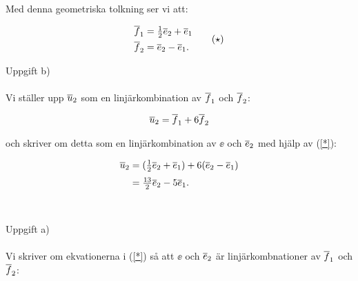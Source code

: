 \documentclass{article}
\begin{document}
\noindent Med denna geometriska tolkning ser vi att:

\begin{equation}
  \begin{aligned}
    \overline{f}_{1} &= \tfrac{1}{2}\overline{e}_{2} + \overline{e}_{1} \\
    \overline{f}_{2} &= \overline{e}_{2} - \overline{e}_{1}\text{.}
  \end{aligned}
  \tag{$\star$}\label{*}
\end{equation}

%
%
%

\newpage

\noindent Uppgift b)
\\
\\
Vi ställer upp $\overline{u}_{2}$ som en linjärkombination av $\overline{f}_{1}$ och $\overline{f}_{2}$:

\begin{gather*}
  \overline{u}_{2} = \overline{f}_{1} + 6\overline{f}_{2}
\end{gather*}

\noindent och skriver om detta som en linjärkombination av $\ee$ och $\overline{e}_{2}$ med hjälp av (\ref{*}):

\begin{align*}
  \overline{u}_{2} &= (\tfrac{1}{2}\overline{e}_{2} + \overline{e}_{1}) + 6(\overline{e}_{2} - \overline{e}_{1})\\[2pt]
  & = \tfrac{13}{2}\overline{e}_{2} - 5\overline{e}_{1}\text{.}
\end{align*}
\\
\\
Uppgift a)
\\
\\
Vi skriver om ekvationerna i (\ref{*}) så att $\ee$ och $\overline{e}_{2}$ är linjärkombnationer av $\overline{f}_{1}$ och $\overline{f}_{2}$:
\end{document}
